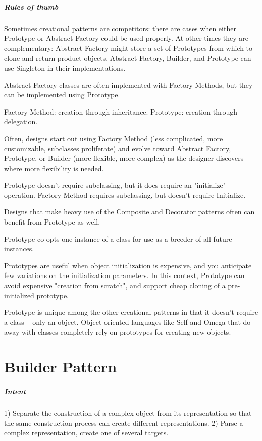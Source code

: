 \documentclass{book}
\begin{document}
\paragraph{Rules of thumb}

    Sometimes creational patterns are competitors: there are cases when either Prototype or Abstract Factory could be used properly.
    At other times they are complementary: Abstract Factory might store a set of Prototypes from which to clone and return product objects.
    Abstract Factory, Builder, and Prototype can use Singleton in their implementations.

    Abstract Factory classes are often implemented with Factory Methods, but they can be implemented using Prototype.

    Factory Method: creation through inheritance. Prototype: creation through delegation.

    Often, designs start out using Factory Method (less complicated, more customizable, subclasses proliferate) and evolve toward Abstract Factory,
    Prototype, or Builder (more flexible, more complex) as the designer discovers where more flexibility is needed.

    Prototype doesn't require subclassing, but it does require an "initialize" operation. Factory Method requires subclassing, but doesn't require Initialize.

    Designs that make heavy use of the Composite and Decorator patterns often can benefit from Prototype as well.

    Prototype co-opts one instance of a class for use as a breeder of all future instances.

    Prototypes are useful when object initialization is expensive, and you anticipate few variations on the initialization parameters.
    In this context, Prototype can avoid expensive "creation from scratch", and support cheap cloning of a pre-initialized prototype.

    Prototype is unique among the other creational patterns in that it doesn't require a class – only an object.
    Object-oriented languages like Self and Omega that do away with classes completely rely on prototypes for creating new objects.


\chapter{Builder Pattern}\label{BuilderPattern}

\paragraph{Intent}
 1)   Separate the construction of a complex object from its representation so that the same construction process can create different representations.
  2)  Parse a complex representation, create one of several targets.
\end{document}
